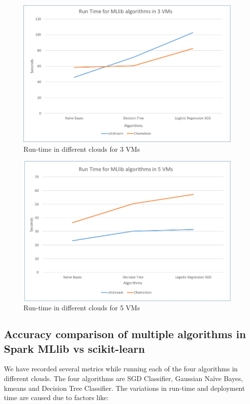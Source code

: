 \documentclass[9pt,twocolumn,twoside]{../../styles/osajnl}
\begin{document}
\begin{figure}[h!]
\centering
\includegraphics[width=\linewidth]{images/algoruntime3.png}
\caption{Run-time in different clouds for 3 VMs}
\label{fig:bench1}
\end{figure}

\begin{figure}[h!]
	\centering
	\includegraphics[width=\linewidth]{images/algoruntime5.png}
	\caption{Run-time in different clouds for 5 VMs}
	\label{fig:bench2}
\end{figure}


\subsection{Accuracy comparison of multiple algorithms in Spark MLlib vs scikit-learn}

We have recorded several metrics while running each of the four algorithms in different clouds. The four algorithms are SGD Classifier, Gaussian Naïve Bayes, kmeans and Decision Tree Classifier.
The variations in run-time and deployment time are caused due to factors like:
\end{document}
